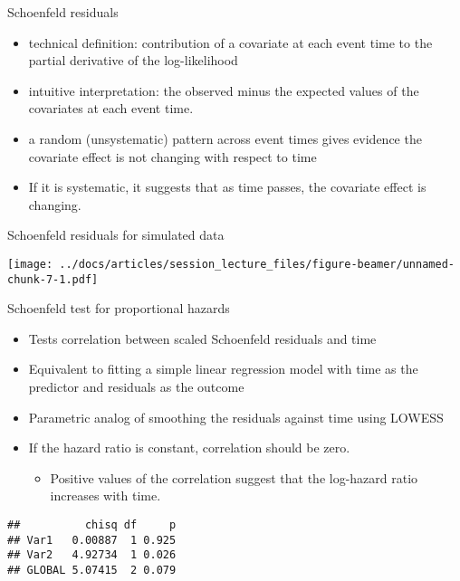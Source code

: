 \documentclass[
  ignorenonframetext,
]{beamer}
\providecommand{\tightlist}{%
  \setlength{\itemsep}{0pt}\setlength{\parskip}{0pt}}
\begin{document}
\begin{frame}{Schoenfeld residuals}
\protect\hypertarget{schoenfeld-residuals}{}

\begin{itemize}
\tightlist
\item
  technical definition: contribution of a covariate at each event time
  to the partial derivative of the log-likelihood
\item
  intuitive interpretation: the observed minus the expected values of
  the covariates at each event time.
\item
  a random (unsystematic) pattern across event times gives evidence the
  covariate effect is not changing with respect to time
\item
  If it is systematic, it suggests that as time passes, the covariate
  effect is changing.
\end{itemize}

\end{frame}

\begin{frame}{Schoenfeld residuals for simulated data}
\protect\hypertarget{schoenfeld-residuals-for-simulated-data}{}

\texttt{[image: ../docs/articles/session\_lecture\_files/figure-beamer/unnamed-chunk-7-1.pdf]}

\end{frame}

\begin{frame}[fragile]{Schoenfeld test for proportional hazards}
\protect\hypertarget{schoenfeld-test-for-proportional-hazards}{}

\begin{itemize}
\tightlist
\item
  Tests correlation between scaled Schoenfeld residuals and time
\item
  Equivalent to fitting a simple linear regression model with time as
  the predictor and residuals as the outcome
\item
  Parametric analog of smoothing the residuals against time using LOWESS
\item
  If the hazard ratio is constant, correlation should be zero.

  \begin{itemize}
  \tightlist
  \item
    Positive values of the correlation suggest that the log-hazard ratio
    increases with time.
  \end{itemize}
\end{itemize}

\begin{verbatim}
##          chisq df     p
## Var1   0.00887  1 0.925
## Var2   4.92734  1 0.026
## GLOBAL 5.07415  2 0.079
\end{verbatim}

\end{frame}
\end{document}
